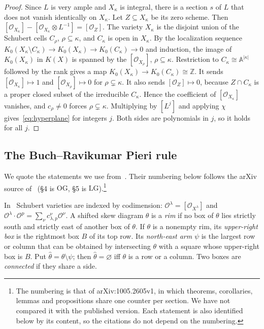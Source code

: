 \documentclass[11pt]{amsart}
\theoremstyle{definition}
\theoremstyle{remark}
\newcommand{\LG}{\mathrm{LG}}
\newcommand{\OG}{\mathrm{OG}}
\newcommand{\cO}{\mathcal{O}}
\newcommand{\Z}{\mathbb{Z}}
\begin{document}
\begin{proof}
Since $L$ is very ample and $X_\kappa$ is integral, there is a section $s$ of $L$ that does not
vanish identically on $X_\kappa$. Let $Z\subseteq X_\kappa$ be its zero scheme. Then
$[\cO_{X_\kappa}]-[\cO_{X_\kappa}\otimes L^{-1}]=[\cO_Z]$. The variety $X_\kappa$ is the
disjoint union of the Schubert cells $C_\rho$, $\rho\subseteq\kappa$, and $C_\kappa$ is open in
$X_\kappa$. By the localization sequence $K_0(X_\kappa\setminus C_\kappa)\to K_0(X_\kappa)\to
K_0(C_\kappa)\to0$ and induction, the image of $K_0(X_\kappa)$ in $K(X)$ is spanned by the
$[\cO_{X_\rho}]$, $\rho\subseteq\kappa$. Restriction to $C_\kappa\cong\mathbb{A}^{|\kappa|}$
followed by the rank gives a map $K_0(X_\kappa)\to K_0(C_\kappa)\cong\Z$. It sends
$[\cO_{X_\kappa}]\mapsto1$ and $[\cO_{X_\rho}]\mapsto0$ for $\rho\subsetneq\kappa$. It also sends
$[\cO_Z]\mapsto0$, because $Z\cap C_\kappa$ is a proper closed subset of the irreducible
$C_\kappa$. Hence the coefficient of $[\cO_{X_\kappa}]$ vanishes, and $c_\rho\ne0$ forces
$\rho\subsetneq\kappa$. Multiplying by $[L^j]$ and applying $\chi$ gives~\eqref{eq:hyperplane}
for integers $j$. Both sides are polynomials in $j$, so it holds for all $j$.
\end{proof}

\subsection{The Buch--Ravikumar Pieri rule}\label{ssec:BR}
We quote the statements we use from~\cite{BR12}. Their numbering below follows the arXiv
source of~\cite{BR12} (\S4 is $\OG$, \S5 is $\LG$).\footnote{The numbering is that of
arXiv:1005.2605v1, in which theorems, corollaries, lemmas and propositions share one counter per
section. We have not compared it with the published version. Each statement is also identified
below by its content, so the citations do not depend on the numbering.}

In~\cite{BR12} Schubert varieties are indexed by codimension: $\cO^\lambda=[\cO_{X^\lambda}]$
and $\cO^\lambda\cdot\cO^p=\sum_\nu c^\nu_{\lambda,p}\cO^\nu$. A shifted skew diagram $\theta$
is a \emph{rim} if no box of $\theta$ lies strictly south and strictly east of another box of
$\theta$. If $\theta$ is a nonempty rim, its \emph{upper-right box} is the rightmost box $B$ of
its top row. Its \emph{north-east arm} $\psi$ is the largest row or column that can be obtained
by intersecting $\theta$ with a square whose upper-right box is $B$. Put
$\hat\theta=\theta\setminus\psi$; then $\hat\theta=\varnothing$ iff $\theta$ is a row or a
column. Two boxes are \emph{connected} if they share a side.
\end{document}
